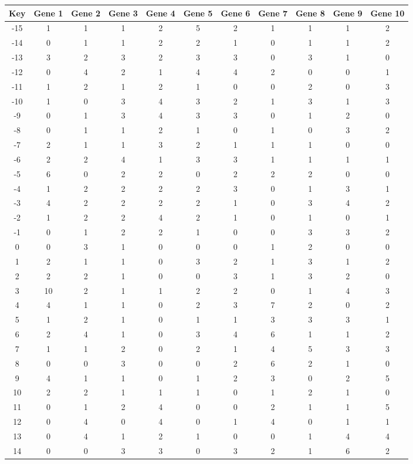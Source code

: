 \begin{tabular}{|c|c|c|c|c|c|c|c|c|c|c|}
\hline
Key & Gene 1 & Gene 2 & Gene 3 & Gene 4 & Gene 5 & Gene 6 & Gene 7 & Gene 8 & Gene 9 & Gene 10 \\
\hline
-15 & 1 & 1 & 1 & 2 & 5 & 2 & 1 & 1 & 1 & 2 \\
-14 & 0 & 1 & 1 & 2 & 2 & 1 & 0 & 1 & 1 & 2 \\
-13 & 3 & 2 & 3 & 2 & 3 & 3 & 0 & 3 & 1 & 0 \\
-12 & 0 & 4 & 2 & 1 & 4 & 4 & 2 & 0 & 0 & 1 \\
-11 & 1 & 2 & 1 & 2 & 1 & 0 & 0 & 2 & 0 & 3 \\
-10 & 1 & 0 & 3 & 4 & 3 & 2 & 1 & 3 & 1 & 3 \\
-9 & 0 & 1 & 3 & 4 & 3 & 3 & 0 & 1 & 2 & 0 \\
-8 & 0 & 1 & 1 & 2 & 1 & 0 & 1 & 0 & 3 & 2 \\
-7 & 2 & 1 & 1 & 3 & 2 & 1 & 1 & 1 & 0 & 0 \\
-6 & 2 & 2 & 4 & 1 & 3 & 3 & 1 & 1 & 1 & 1 \\
-5 & 6 & 0 & 2 & 2 & 0 & 2 & 2 & 2 & 0 & 0 \\
-4 & 1 & 2 & 2 & 2 & 2 & 3 & 0 & 1 & 3 & 1 \\
-3 & 4 & 2 & 2 & 2 & 2 & 1 & 0 & 3 & 4 & 2 \\
-2 & 1 & 2 & 2 & 4 & 2 & 1 & 0 & 1 & 0 & 1 \\
-1 & 0 & 1 & 2 & 2 & 1 & 0 & 0 & 3 & 3 & 2 \\
0 & 0 & 3 & 1 & 0 & 0 & 0 & 1 & 2 & 0 & 0 \\
1 & 2 & 1 & 1 & 0 & 3 & 2 & 1 & 3 & 1 & 2 \\
2 & 2 & 2 & 1 & 0 & 0 & 3 & 1 & 3 & 2 & 0 \\
3 & 10 & 2 & 1 & 1 & 2 & 2 & 0 & 1 & 4 & 3 \\
4 & 4 & 1 & 1 & 0 & 2 & 3 & 7 & 2 & 0 & 2 \\
5 & 1 & 2 & 1 & 0 & 1 & 1 & 3 & 3 & 3 & 1 \\
6 & 2 & 4 & 1 & 0 & 3 & 4 & 6 & 1 & 1 & 2 \\
7 & 1 & 1 & 2 & 0 & 2 & 1 & 4 & 5 & 3 & 3 \\
8 & 0 & 0 & 3 & 0 & 0 & 2 & 6 & 2 & 1 & 0 \\
9 & 4 & 1 & 1 & 0 & 1 & 2 & 3 & 0 & 2 & 5 \\
10 & 2 & 2 & 1 & 1 & 1 & 0 & 1 & 2 & 1 & 0 \\
11 & 0 & 1 & 2 & 4 & 0 & 0 & 2 & 1 & 1 & 5 \\
12 & 0 & 4 & 0 & 4 & 0 & 1 & 4 & 0 & 1 & 1 \\
13 & 0 & 4 & 1 & 2 & 1 & 0 & 0 & 1 & 4 & 4 \\
14 & 0 & 0 & 3 & 3 & 0 & 3 & 2 & 1 & 6 & 2 \\
\hline
\end{tabular}